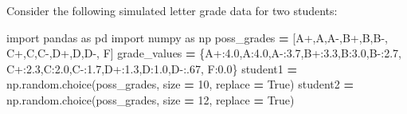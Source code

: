 \documentclass[
  12pt,
  krantz2]{krantz}
\makeatletter
\newenvironment{Shaded}{\begin{snugshade}}{\end{snugshade}}
\newcommand{\DecValTok}[1]{\textcolor[rgb]{0.06,0.06,0.06}{#1}}
\newcommand{\FloatTok}[1]{\textcolor[rgb]{0.06,0.06,0.06}{#1}}
\newcommand{\ImportTok}[1]{#1}
\newcommand{\NormalTok}[1]{#1}
\newcommand{\OperatorTok}[1]{\textcolor[rgb]{0.43,0.43,0.43}{\textbf{#1}}}
\newcommand{\StringTok}[1]{\textcolor[rgb]{0.5,0.5,0.5}{#1}}
\newcommand{\VariableTok}[1]{\textcolor[rgb]{0,0,0}{#1}}
\newenvironment{kframe}{%
\medskip{}
\setlength{\fboxsep}{.8em}
 \def\at@end@of@kframe{}%
 \ifinner\ifhmode%
  \def\at@end@of@kframe{\end{minipage}}%
  \begin{minipage}{\columnwidth}%
 \fi\fi%
 \def\FrameCommand##1{\hskip\@totalleftmargin \hskip-\fboxsep
 \colorbox{shadecolor}{##1}\hskip-\fboxsep
     \hskip-\linewidth \hskip-\@totalleftmargin \hskip\columnwidth}%
 \MakeFramed {\advance\hsize-\width
   \@totalleftmargin\z@ \linewidth\hsize
   \@setminipage}}%
 {\par\unskip\endMakeFramed%
 \at@end@of@kframe}
\renewenvironment{Shaded}{\begin{kframe}}{\end{kframe}}
\makeatother
\begin{document}
Consider the following simulated letter grade data for two students:

\begin{Shaded}
\begin{Highlighting}[]
\ImportTok{import}\NormalTok{ pandas }\ImportTok{as}\NormalTok{ pd}
\ImportTok{import}\NormalTok{ numpy }\ImportTok{as}\NormalTok{ np}
\NormalTok{poss\_grades }\OperatorTok{=}\NormalTok{ [}\StringTok{\textquotesingle{}A+\textquotesingle{}}\NormalTok{,}\StringTok{\textquotesingle{}A\textquotesingle{}}\NormalTok{,}\StringTok{\textquotesingle{}A{-}\textquotesingle{}}\NormalTok{,}\StringTok{\textquotesingle{}B+\textquotesingle{}}\NormalTok{,}\StringTok{\textquotesingle{}B\textquotesingle{}}\NormalTok{,}\StringTok{\textquotesingle{}B{-}\textquotesingle{}}\NormalTok{,}
               \StringTok{\textquotesingle{}C+\textquotesingle{}}\NormalTok{,}\StringTok{\textquotesingle{}C\textquotesingle{}}\NormalTok{,}\StringTok{\textquotesingle{}C{-}\textquotesingle{}}\NormalTok{,}\StringTok{\textquotesingle{}D+\textquotesingle{}}\NormalTok{,}\StringTok{\textquotesingle{}D\textquotesingle{}}\NormalTok{,}\StringTok{\textquotesingle{}D{-}\textquotesingle{}}\NormalTok{,}
               \StringTok{\textquotesingle{}F\textquotesingle{}}\NormalTok{]}
\NormalTok{grade\_values }\OperatorTok{=}\NormalTok{ \{}\StringTok{\textquotesingle{}A+\textquotesingle{}}\NormalTok{:}\FloatTok{4.0}\NormalTok{,}\StringTok{\textquotesingle{}A\textquotesingle{}}\NormalTok{:}\FloatTok{4.0}\NormalTok{,}\StringTok{\textquotesingle{}A{-}\textquotesingle{}}\NormalTok{:}\FloatTok{3.7}\NormalTok{,}\StringTok{\textquotesingle{}B+\textquotesingle{}}\NormalTok{:}\FloatTok{3.3}\NormalTok{,}\StringTok{\textquotesingle{}B\textquotesingle{}}\NormalTok{:}\FloatTok{3.0}\NormalTok{,}\StringTok{\textquotesingle{}B{-}\textquotesingle{}}\NormalTok{:}\FloatTok{2.7}\NormalTok{,}
                \StringTok{\textquotesingle{}C+\textquotesingle{}}\NormalTok{:}\FloatTok{2.3}\NormalTok{,}\StringTok{\textquotesingle{}C\textquotesingle{}}\NormalTok{:}\FloatTok{2.0}\NormalTok{,}\StringTok{\textquotesingle{}C{-}\textquotesingle{}}\NormalTok{:}\FloatTok{1.7}\NormalTok{,}\StringTok{\textquotesingle{}D+\textquotesingle{}}\NormalTok{:}\FloatTok{1.3}\NormalTok{,}\StringTok{\textquotesingle{}D\textquotesingle{}}\NormalTok{:}\FloatTok{1.0}\NormalTok{,}\StringTok{\textquotesingle{}D{-}\textquotesingle{}}\NormalTok{:}\FloatTok{.67}\NormalTok{,}
                \StringTok{\textquotesingle{}F\textquotesingle{}}\NormalTok{:}\FloatTok{0.0}\NormalTok{\}}
\NormalTok{student1 }\OperatorTok{=}\NormalTok{ np.random.choice(poss\_grades, size }\OperatorTok{=} \DecValTok{10}\NormalTok{, replace }\OperatorTok{=} \VariableTok{True}\NormalTok{)}
\NormalTok{student2 }\OperatorTok{=}\NormalTok{ np.random.choice(poss\_grades, size }\OperatorTok{=} \DecValTok{12}\NormalTok{, replace }\OperatorTok{=} \VariableTok{True}\NormalTok{)}
\end{Highlighting}
\end{Shaded}
\end{document}
